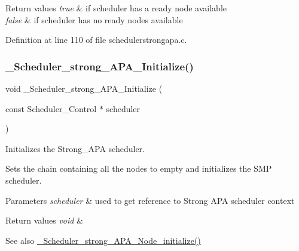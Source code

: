 \begin{DoxyRetVals}{Return values}
{\em true} & if scheduler has a ready node available \\
\hline
{\em false} & if scheduler has no ready nodes available \\
\hline
\end{DoxyRetVals}


Definition at line 110 of file schedulerstrongapa.\+c.

\mbox{\label{group__RTEMSScoreSchedulerStrongAPA_gafcd6fde337d7542784698219322b6365}} 
\subsubsection{\texorpdfstring{\+\_\+\+Scheduler\+\_\+strong\+\_\+\+A\+P\+A\+\_\+\+Initialize()}{\_Scheduler\_strong\_APA\_Initialize()}}
{\footnotesize\ttfamily void \+\_\+\+Scheduler\+\_\+strong\+\_\+\+A\+P\+A\+\_\+\+Initialize (\begin{DoxyParamCaption}\item[{const Scheduler\+\_\+\+Control $\ast$}]{scheduler }\end{DoxyParamCaption})}



Initializes the Strong\+\_\+\+A\+PA scheduler. 

Sets the chain containing all the nodes to empty and initializes the S\+MP scheduler.


\begin{DoxyParams}{Parameters}
{\em scheduler} & used to get reference to Strong A\+PA scheduler context \\
\hline
\end{DoxyParams}

\begin{DoxyRetVals}{Return values}
{\em void} & \\
\hline
\end{DoxyRetVals}
\begin{DoxySeeAlso}{See also}
\hyperlink{group__RTEMSScoreSchedulerStrongAPA_ga1cde4345d4dc0b5a37a696fa446bb47e}{\+\_\+\+Scheduler\+\_\+strong\+\_\+\+A\+P\+A\+\_\+\+Node\+\_\+initialize()} 
\end{DoxySeeAlso}


